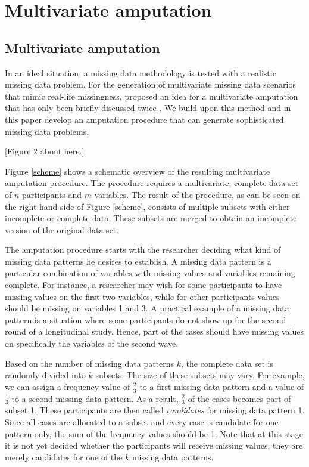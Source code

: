 \documentclass[]{interact}
\begin{document}
\section{Multivariate amputation}

\subsection{\normalsize Multivariate amputation}\label{method}

In an ideal situation, a missing data methodology is tested with a realistic missing data problem. For the generation of multivariate missing data scenarios that mimic real-life missingness, \citep[][pp. 110 - 113]{Jaap1999} proposed an idea for a multivariate amputation that has only been briefly discussed twice \citep{Stef2006, Jaap2003}. We build upon this method and in this paper develop an amputation procedure that can generate sophisticated missing data problems. 

[Figure 2 about here.]

Figure \ref{scheme} shows a schematic overview of the resulting  multivariate amputation procedure. The procedure requires a multivariate, complete data set of $n$ participants and $m$ variables. The result of the procedure, as can be seen on the right hand side of Figure \ref{scheme}, consists of multiple subsets with either incomplete or complete data. These subsets are merged to obtain an incomplete version of the original data set. 

The amputation procedure starts with the researcher deciding what kind of missing data patterns he desires to establish. A missing data pattern is a particular combination of variables with missing values and variables remaining complete. For instance, a researcher may wish for some participants to have missing values on the first two variables, while for other participants values should be missing on variables 1 and 3. A practical example of a missing data pattern is a situation where some participants do not show up for the second round of a longitudinal study. Hence, part of the cases should have missing values on specifically the variables of the second wave. 

Based on the number of missing data patterns $k$, the complete data set is randomly divided into $k$ subsets. The size of these subsets may vary. For example, we can assign a frequency value of $\frac{2}{3}$ to a first missing data pattern and a value of $\frac{1}{3}$ to a second missing data pattern. As a result, $\frac{2}{3}$ of the cases becomes part of subset 1. These participants are then called \textit{candidates} for missing data pattern 1. Since all cases are allocated to a subset and every case is candidate for one pattern only, the sum of the frequency values should be 1. Note that at this stage it is not yet decided whether the participants will receive missing values; they are merely candidates for one of the $k$ missing data patterns.  
\end{document}
